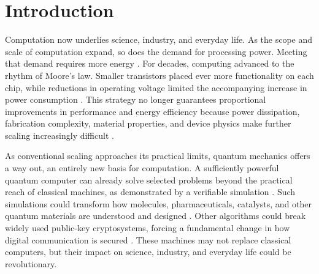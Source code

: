 
\chapter{Introduction}
\label{ch:introduction}
\thispagestyle{chapterstart}

    Computation now underlies science, industry, and everyday life. As the scope and scale of computation expand, so does the demand for processing power. Meeting that demand requires more energy \cite{iea_energy_ai_2025}. For decades, computing advanced to the rhythm of Moore's law. Smaller transistors placed ever more functionality on each chip, while reductions in operating voltage limited the accompanying increase in power consumption \cite{moore_cramming_1965,dennard_design_1974}. This strategy no longer guarantees proportional improvements in performance and energy efficiency because power dissipation, fabrication complexity, material properties, and device physics make further scaling increasingly difficult \cite{markov_limits_2014}.
    
    As conventional scaling approaches its practical limits, quantum mechanics offers a way out, an entirely new basis for computation. A sufficiently powerful quantum computer can already solve selected problems beyond the practical reach of classical machines, as demonstrated by a verifiable simulation \cite{google_quantum_ai_ergodicity_2025}. Such simulations could transform how molecules, pharmaceuticals, catalysts, and other quantum materials are understood and designed \cite{feynman_simulating_1982,mcardle_quantum_2020}. Other algorithms could break widely used public-key cryptosystems, forcing a fundamental change in how digital communication is secured \cite{shor_algorithms_1994}. These machines may not replace classical computers, but their impact on science, industry, and everyday life could be revolutionary.

